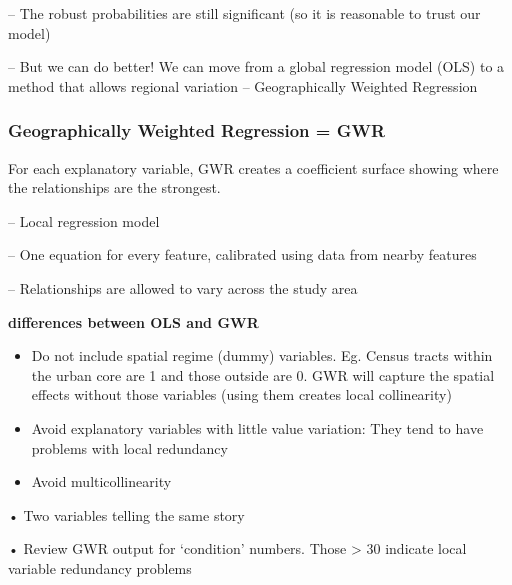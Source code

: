 \documentclass[
]{article}
\begin{document}
-- The robust probabilities are still significant (so it is reasonable
to trust our model)

-- But we can do better! We can move from a global regression model
(OLS) to a method that allows regional variation -- Geographically
Weighted Regression

\hypertarget{geographically-weighted-regression-gwr}{%
\subsubsection{Geographically Weighted Regression =
GWR}\label{geographically-weighted-regression-gwr}}

For each explanatory variable, GWR creates a coefficient surface showing
where the relationships are the strongest.

-- Local regression model

-- One equation for every feature, calibrated using data from nearby
features

-- Relationships are allowed to vary across the study area

\textbf{differences between OLS and GWR}

\begin{itemize}
\item
  Do not include spatial regime (dummy) variables. Eg. Census tracts
  within the urban core are 1 and those outside are 0. GWR will capture
  the spatial effects without those variables (using them creates local
  collinearity)
\item
  Avoid explanatory variables with little value variation: They tend to
  have problems with local redundancy
\item
  Avoid multicollinearity
\end{itemize}

• Two variables telling the same story

• Review GWR output for `condition' numbers. Those \textgreater{} 30
indicate local variable redundancy problems
\end{document}
